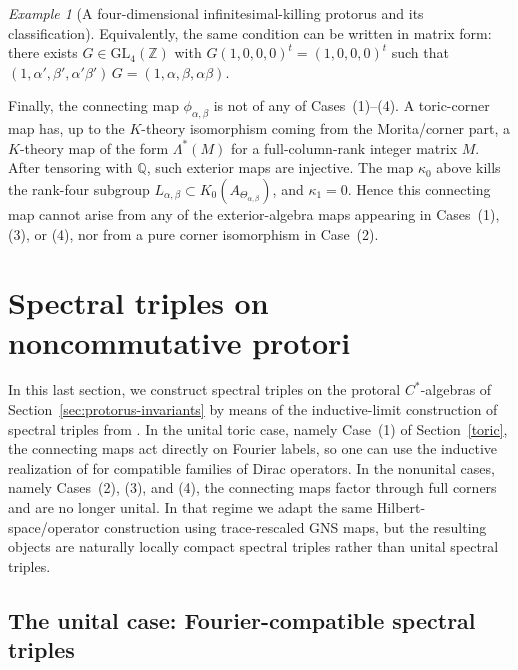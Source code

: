 \documentclass[11pt]{amsart}
\theoremstyle{definition}
\theoremstyle{remark}
\newtheorem{example}[theorem]{Example}
\newcommand{\Z}{\mathbb{Z}}
\newcommand{\GL}{\mathrm{GL}}
\begin{document}
\begin{example}[A four-dimensional infinitesimal-killing protorus and its classification]
Equivalently, the same condition can be written in matrix form: there exists $G\in\GL_4(\Z)$
with $G(1,0,0,0)^t=(1,0,0,0)^t$
such that $(1,\alpha',\beta',\alpha'\beta')\,G=(1,\alpha,\beta,\alpha\beta).$

Finally, the connecting map $\phi_{\alpha,\beta}$ is not of any of
Cases~\textup{(1)}--\textup{(4)}. A toric-corner map has, up to the
$K$-theory isomorphism coming from the Morita/corner part, a $K$-theory
map of the form $\Lambda^*(M)$ for a full-column-rank integer matrix $M$.
After tensoring with $\mathbb Q$, such exterior maps are injective. The map
$\kappa_0$ above kills the rank-four subgroup
$L_{\alpha,\beta}\subset K_0(A_{\Theta_{\alpha,\beta}})$, and
$\kappa_1=0$. Hence this connecting map cannot arise from any of the
exterior-algebra maps appearing in Cases~\textup{(1)}, \textup{(3)}, or
\textup{(4)}, nor from a pure corner isomorphism in Case~\textup{(2)}.


\end{example}

\section{Spectral triples on noncommutative protori}
\label{sec:spectral-triples}

In this last section, we construct spectral triples on the protoral
$C^*$-algebras of Section~\ref{sec:protorus-invariants} by means of the
inductive-limit construction of spectral triples from \cite{FloricelGhorbanpour}. In the unital toric
case, namely Case~\textup{(1)} of Section~\ref{toric}, the connecting maps act
directly on Fourier labels, so one can use the %
inductive realization of \cite{FloricelGhorbanpour}  for compatible families of Dirac operators. In the
nonunital cases, namely Cases~\textup{(2)}, \textup{(3)}, and \textup{(4)}, the
connecting maps factor through full corners and are no longer unital. In that
regime we adapt the same Hilbert-space/operator construction using
trace-rescaled GNS maps, but the resulting objects are naturally locally
compact spectral triples rather than unital spectral triples.

\subsection{The unital case: Fourier-compatible spectral triples}
\label{subsec:unital-fourier-compatible}
\end{document}
